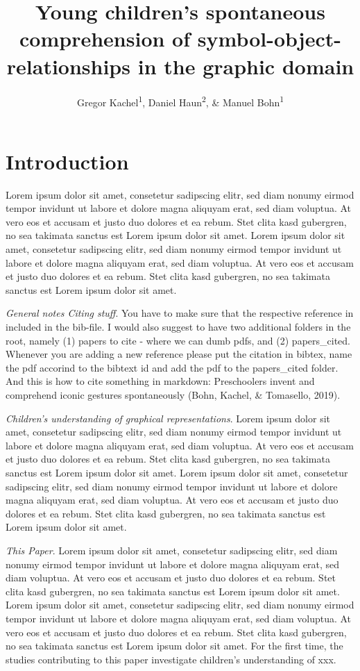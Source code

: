 \documentclass[
  man]{apa6}
\title{Young children's spontaneous comprehension of symbol-object-relationships in the graphic domain}
\author{Gregor Kachel\textsuperscript{1}, Daniel Haun\textsuperscript{2}, \& Manuel Bohn\textsuperscript{1}}
\date{}
\affiliation{\vspace{0.5cm}\textsuperscript{1} Leuphana University\\\textsuperscript{2} Max-Planck-Institute for Evolutionary Anthropology}
\begin{document}
\maketitle

\section{Introduction}\label{introduction}

Lorem ipsum dolor sit amet, consetetur sadipscing elitr, sed diam nonumy eirmod tempor invidunt ut labore et dolore magna aliquyam erat, sed diam voluptua. At vero eos et accusam et justo duo dolores et ea rebum. Stet clita kasd gubergren, no sea takimata sanctus est Lorem ipsum dolor sit amet. Lorem ipsum dolor sit amet, consetetur sadipscing elitr, sed diam nonumy eirmod tempor invidunt ut labore et dolore magna aliquyam erat, sed diam voluptua. At vero eos et accusam et justo duo dolores et ea rebum. Stet clita kasd gubergren, no sea takimata sanctus est Lorem ipsum dolor sit amet.

\emph{General notes Citing stuff}. You have to make sure that the respective reference in included in the bib-file. I would also suggest to have two additional folders in the root, namely (1) papers to cite - where we can dumb pdfs, and (2) papers\_cited. Whenever you are adding a new reference please put the citation in bibtex, name the pdf accorind to the bibtext id and add the pdf to the papers\_cited folder. And this is how to cite something in markdown: Preschoolers invent and comprehend iconic gestures spontaneously (Bohn, Kachel, \& Tomasello, 2019).

\emph{Children's understanding of graphical representations}. Lorem ipsum dolor sit amet, consetetur sadipscing elitr, sed diam nonumy eirmod tempor invidunt ut labore et dolore magna aliquyam erat, sed diam voluptua. At vero eos et accusam et justo duo dolores et ea rebum. Stet clita kasd gubergren, no sea takimata sanctus est Lorem ipsum dolor sit amet. Lorem ipsum dolor sit amet, consetetur sadipscing elitr, sed diam nonumy eirmod tempor invidunt ut labore et dolore magna aliquyam erat, sed diam voluptua. At vero eos et accusam et justo duo dolores et ea rebum. Stet clita kasd gubergren, no sea takimata sanctus est Lorem ipsum dolor sit amet.

\emph{This Paper}. Lorem ipsum dolor sit amet, consetetur sadipscing elitr, sed diam nonumy eirmod tempor invidunt ut labore et dolore magna aliquyam erat, sed diam voluptua. At vero eos et accusam et justo duo dolores et ea rebum. Stet clita kasd gubergren, no sea takimata sanctus est Lorem ipsum dolor sit amet. Lorem ipsum dolor sit amet, consetetur sadipscing elitr, sed diam nonumy eirmod tempor invidunt ut labore et dolore magna aliquyam erat, sed diam voluptua. At vero eos et accusam et justo duo dolores et ea rebum. Stet clita kasd gubergren, no sea takimata sanctus est Lorem ipsum dolor sit amet. For the first time, the studies contributing to this paper investigate children's understanding of xxx.
\end{document}
